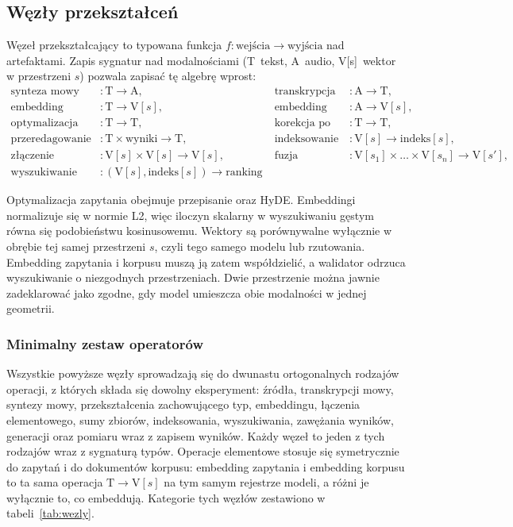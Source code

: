 \subsection{Węzły przekształceń}
Węzeł przekształcający to typowana funkcja $f:\text{wejścia} \rightarrow \text{wyjścia}$ nad
artefaktami. Zapis sygnatur nad modalnościami (T~tekst, A~audio, V[s]~wektor w przestrzeni $s$)
pozwala zapisać tę algebrę wprost:
\begin{equation}
\begin{aligned}
\text{synteza mowy} &: \text{T} \rightarrow \text{A},
&\;
\text{transkrypcja} &: \text{A} \rightarrow \text{T}, \\[3pt]
\text{embedding tekstu} &: \text{T} \rightarrow \text{V}[s],
&\;
\text{embedding audio} &: \text{A} \rightarrow \text{V}[s], \\[3pt]
\text{optymalizacja} &: \text{T} \rightarrow \text{T},
&\;
\text{korekcja po ASR} &: \text{T} \rightarrow \text{T}, \\[3pt]
\text{przeredagowanie} &: \text{T} \times \text{wyniki} \rightarrow \text{T},
&\;
\text{indeksowanie} &: \text{V}[s] \rightarrow \text{indeks}[s], \\[3pt]
\text{złączenie korpusów} &: \text{V}[s] \times \text{V}[s] \rightarrow \text{V}[s],
&\;
\text{fuzja embeddingów} &: \text{V}[s_1] \times \dots \times \text{V}[s_n] \rightarrow \text{V}[s'],
\\[3pt]
\text{wyszukiwanie} &: (\text{V}[s], \text{indeks}[s]) \rightarrow \text{ranking}
\end{aligned}
\label{eq:sygnatury}
\end{equation}

Optymalizacja zapytania obejmuje przepisanie oraz HyDE.
Embeddingi normalizuje się w normie L2, więc iloczyn skalarny w wyszukiwaniu gęstym równa się
podobieństwu kosinusowemu. Wektory są porównywalne wyłącznie w obrębie tej samej przestrzeni
$s$, czyli tego samego modelu lub rzutowania. Embedding zapytania i korpusu muszą ją zatem
współdzielić, a walidator odrzuca wyszukiwanie o niezgodnych przestrzeniach. Dwie przestrzenie
można jawnie zadeklarować jako zgodne, gdy model umieszcza obie modalności w jednej geometrii.

\subsubsection{Minimalny zestaw operatorów}
Wszystkie powyższe węzły sprowadzają się do dwunastu ortogonalnych rodzajów operacji, z których
składa się dowolny eksperyment: źródła, transkrypcji mowy, syntezy mowy, przekształcenia
zachowującego typ, embeddingu, łączenia elementowego, sumy zbiorów, indeksowania, wyszukiwania,
zawężania wyników, generacji oraz pomiaru wraz z zapisem wyników. Każdy węzeł to jeden z tych rodzajów
wraz z sygnaturą typów. Operacje elementowe stosuje się symetrycznie do zapytań i do dokumentów
korpusu: embedding zapytania i embedding korpusu to ta sama operacja
$\text{T} \rightarrow \text{V}[s]$ na tym samym rejestrze modeli, a różni je wyłącznie to, co
embeddują. Kategorie tych węzłów zestawiono w tabeli~\ref{tab:wezly}.

